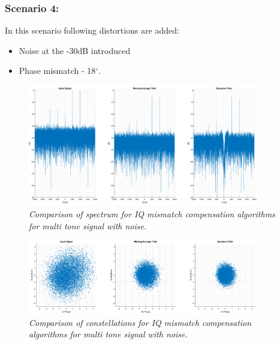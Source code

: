 \documentclass[en,printmode]{mgr}
\begin{document}
   		\subsubsection*{Scenario 4: }
			In this scenario following distortions are added:
			\begin{itemize}
				\item Noise at the -30dB introduced
				\item Phase mismatch - 18$^\circ$.
			\end{itemize}
				\begin{figure}[H]
    			\centering
   				\includegraphics[width=0.9\textwidth]{plots/multi_nf3.png}
   		 		\caption{\textit{Comparison of spectrum for IQ mismatch compensation algorithms for 
   		 		multi tone signal with noise.}}
   		 	\end{figure}
   		 	\begin{figure}[H]
    			\centering
   				\includegraphics[width=0.9\textwidth]{plots/multi_nc3.png}
   		 		\caption{\textit{Comparison of constellations for IQ mismatch compensation algorithms 
   		 		for multi tone signal with noise.}}
   		 	\end{figure}
   		 	
\end{document}
